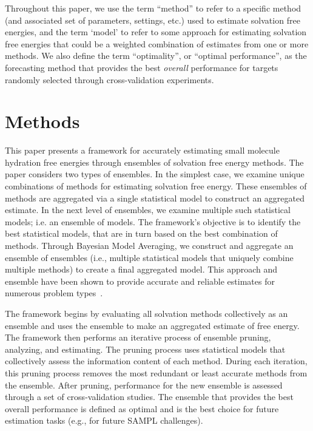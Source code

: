 \documentclass[journal=jpcbfk, manuscript=article]{achemso}
\newcommand{\+}[1]{\ensuremath{\mathbf{#1}}}
\newcommand{\rev}[1]{#1}
\begin{document}
\rev{Throughout this paper, we use the term ``method'' to refer to a specific method (and associated set of parameters, settings, etc.) used to estimate solvation free energies, and the term `model' to refer to some approach for estimating solvation free energies that could be a weighted combination of estimates from one or more methods.
We also define the term ``optimality'', or ``optimal performance'', as the forecasting method that provides the best \emph{overall} performance for targets randomly selected through cross-validation experiments.}

\section{Methods} \label{MethodMain}
\rev{This paper presents a framework for accurately  estimating  small molecule hydration free energies through ensembles of solvation free energy methods.
The paper considers two types of ensembles.
In the simplest case, we examine unique combinations of methods for estimating solvation free energy.
These ensembles of methods are aggregated via a single statistical model to construct an aggregated estimate. 
In the next level of ensembles, we examine multiple such statistical models; i.e. an ensemble of models. 
The framework's objective is to identify the best statistical models, that are in turn based on the best combination of methods.
Through Bayesian Model Averaging, we construct and aggregate an ensemble of ensembles (i.e., multiple statistical models that uniquely combine multiple methods) to create a final aggregated model.
This approach and ensemble have been shown to provide accurate and reliable estimates for numerous problem types~\cite{Gosink:2014, Zhang:2003, Bates:1969, Morales-Casique:2010, Opitz:1999, Rokach:2010, Hoeting:1999, Seni:2010, Raftery:2005, Vlachopoulo:2013, Seni:2010, Hoeting:1999, Raftery:1998, Raftery:1995}.}

\rev{The framework begins by evaluating all solvation methods collectively as an ensemble and uses the ensemble to make an aggregated estimate of free energy. 
The framework then performs an iterative process of ensemble pruning, analyzing, and estimating.
The pruning process uses statistical models that collectively assess the information content of each method.
During each iteration, this pruning process removes the most redundant or least accurate methods from the ensemble.
After pruning, performance for the new ensemble is assessed through a set of cross-validation studies.
The ensemble that provides the best overall performance is defined as optimal and is the best choice for future estimation tasks (e.g., for future SAMPL challenges).}
\end{document}
